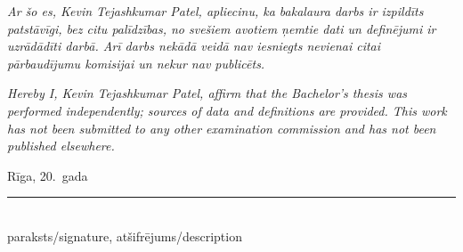 \frontmatterpage
{}
\textit{Ar šo es, Kevin Tejashkumar Patel, apliecinu, ka bakalaura darbs ir izpildīts patstāvīgi, bez citu palīdzības, no svešiem avotiem ņemtie dati un definējumi ir uzrādādīti darbā. Arī darbs nekādā veidā nav iesniegts nevienai citai pārbaudījumu komisijai un nekur nav publicēts.}

\vspace{12mm}
\noindent\textit{Hereby I, Kevin Tejashkumar Patel, affirm that the Bachelor's thesis was performed independently; sources of data and definitions are provided. This work has not been submitted to any other examination commission and has not been published elsewhere.}

\vspace{14mm}
\noindent Rīga, 20\underline{\hspace{1cm}}.\ gada \underline{\hspace{2.5cm}} \hspace{1cm}\rule{5cm}{0.4pt}\\
\hspace*{7.1cm}\scriptsize paraksts/signature, atšifrējums/description \hfill
